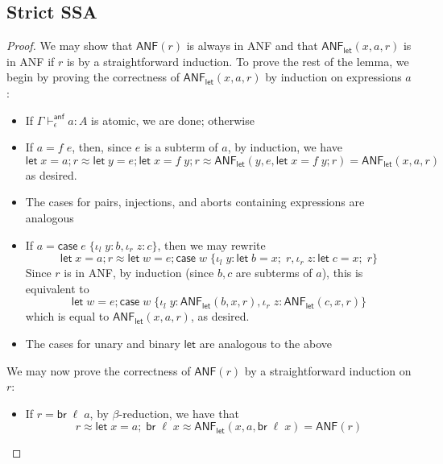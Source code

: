 \documentclass[acmsmall,screen,review]{acmart}
\newcommand{\ms}[1]{\ensuremath{\mathsf{#1}}}
\newcommand{\lto}{:}
\newcommand{\linl}[1]{\iota_l\;{#1}}
\newcommand{\linr}[1]{\iota_r\;{#1}}
\newcommand{\letexpr}[3]{\ensuremath{\ms{let}\;#1 = #2;\;#3}}
\newcommand{\caseexpr}[5]{\ms{case}\;#1\;\{\linl{#2} \lto #3, \linr{#4} \lto #5\}}
\newcommand{\letstmt}[3]{\ensuremath{\ms{let}\;#1 = #2; #3}}
\newcommand{\brb}[2]{\ms{br}\;#1\;#2}
\newcommand{\casestmt}[5]{\ms{case}\;#1\;\{\linl{#2} \lto #3, \linr{#4} \lto #5\}}
\newcommand{\ahasty}[4]{#1 \vdash_{#2}^{\ms{anf}} #3 : {#4}}
\newcommand{\teqv}{\approx}
\newcommand{\toanf}[1]{\ms{ANF}(#1)}
\newcommand{\letanf}[3]{\ms{ANF}_{\ms{let}}(#1, #2, #3)}
\begin{document}
\subsection{Strict SSA}

\anfconversion*

\label{proof:anf-conversion}

\begin{proof}
  We may show that $\ms{ANF}(r)$ is always in ANF and that $\ms{ANF}_{\ms{let}}(x, a, r)$ is in ANF
  if $r$ is by a straightforward induction. To prove the rest of the lemma, we begin by proving the
  correctness of $\ms{ANF}_{\ms{let}}(x, a, r)$ by induction on expressions $a$:
  \begin{itemize}
    \item If $\ahasty{\Gamma}{\epsilon}{a}{A}$ is atomic, we are done; otherwise
    \item If $a = f\;e$, then, since $e$ is a subterm of $a$, by induction, we have
    \begin{equation}
      \letstmt{x}{a}{r} 
      \teqv \letstmt{y}{e}{\letstmt{x}{f\;y}{r}}
      \teqv \letanf{y}{e}{\letstmt{x}{f\;y}{r}}
      = \letanf{x}{a}{r}
    \end{equation}
    as desired.
    \item The cases for pairs, injections, and aborts containing expressions are analogous
    \item If $a = \caseexpr{e}{y}{b}{z}{c}$, then we may rewrite
    \begin{equation}
      \letstmt{x}{a}{r} 
      \teqv \letstmt{w}{e}{\casestmt{w}{y}{\letexpr{b}{x}{r}}{z}{\letexpr{c}{x}{r}}}
    \end{equation}
    Since $r$ is in ANF, by induction (since $b, c$ are subterms of $a$), this is equivalent to
    \begin{equation}
      \letstmt{w}{e}
        {\casestmt{w}{y}{\letanf{b}{x}{r}}{z}{\letanf{c}{x}{r}}}
    \end{equation}
    which is equal to $\letanf{x}{a}{r}$, as desired.
    \item The cases for unary and binary $\ms{let}$ are analogous to the above
  \end{itemize}
  We may now prove the correctness of $\toanf{r}$ by a straightforward induction on $r$:
  \begin{itemize}
    \item If $r = \brb{\ell}{a}$, by $\beta$-reduction, we have that
    \begin{equation}
      r \teqv \letexpr{x}{a}{\brb{\ell}{x}} \teqv \letanf{x}{a}{\brb{\ell}{x}} = \toanf{r}

\end{equation}
\end{itemize}
\end{proof}
\end{document}
